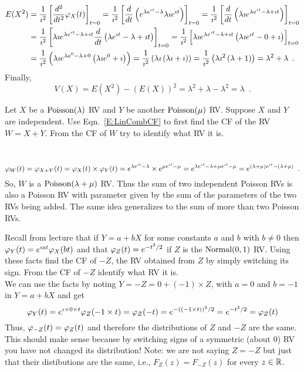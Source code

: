 \begin{ExerciseList}
\begin{align*}
E(X^2) 
&= \frac{1}{\imath^2} \left[ \frac{d^2}{dt^2} \varphi_X(t) \right]_{t=0}
= \frac{1}{\imath^2} \left[ \frac{d}{dt} \left( e^{\lambda e^{\imath t} - \lambda} \lambda \imath e^{\imath t} \right) \right]_{t=0}
= \frac{1}{\imath^2} \left[ \frac{d}{dt} \left( \lambda \imath e^{\lambda e^{\imath t} - \lambda + \imath t} \right) \right]_{t=0}\\
&= \frac{1}{\imath^2} \left[ \lambda \imath e^{\lambda e^{\imath t} - \lambda + \imath t} \frac{d}{dt} \left( \lambda e^{\imath t} - \lambda + \imath t \right) \right]_{t=0}
= \frac{1}{\imath^2} \left[ \lambda \imath e^{\lambda e^{\imath t} - \lambda + \imath t} \left( \lambda \imath e^{\imath t} - 0 + \imath \right) \right]_{t=0}\\
&= \frac{1}{\imath^2} \left( \lambda \imath e^{\lambda e^{0} - \lambda + 0} \left( \lambda \imath e^{0}  + \imath \right) \right)
= \frac{1}{\imath^2} \left( \lambda \imath \left( \lambda \imath  + \imath \right) \right)
= \frac{1}{\imath^2} \left( \lambda \imath^2 \left( \lambda  + 1 \right) \right)
= \lambda^2 + \lambda \enspace .
\end{align*}
Finally,
\[
V(X) = E(X^2) - (E(X))^2 = \lambda^2 + \lambda - \lambda^2 = \lambda \enspace .
\]
\ee

\Exercise
Let $X$ be a $\mbox{{\rm Poisson}}(\lambda)$ RV and $Y$ be another $\mbox{{\rm Poisson}}(\mu)$ RV.  
Suppose $X$ and $Y$ are independent.
Use Eqn.~\eqref{E:LinCombCF} to first find the CF of the RV $W=X+Y$.  
From the CF of $W$ try to identify what RV it is. 

\Answer
~\\
\[
\varphi_{W}(t) = \varphi_{X+Y}(t) = \varphi_X(t) \times \varphi_Y(t) 
= e^{\lambda e^{\imath t}-\lambda} \times e^{\mu e^{\imath t}-\mu}
= e^{\lambda e^{\imath t}-\lambda + \mu e^{\imath t}-\mu} 
= e^{(\lambda+\mu) e^{\imath t} -(\lambda+\mu)} \enspace . 
\]
So, $W$ is a $\mbox{{\rm Poisson}}(\lambda+\mu)$ RV. Thus the sum of two independent Poisson RVs is also a Poisson RV with parameter given by the sum of the parameters of the two RVs being added.  The same idea generalizes to the sum of more than two Poisson RVs. 

\Exercise
Recall from lecture that if $Y=a+bX$ for some constants $a$ and $b$ with $b\neq 0$ then $\varphi_Y(t) = e^{\imath a t} \varphi_X(bt)$ and that $\varphi_Z(t)=e^{-t^2/2}$ if $Z$ is the $\mbox{{\rm Normal}}(0,1)$ RV.  
Using these facts find the CF of $-Z$, the RV obtained from $Z$ by simply switching its sign.
From the CF of $-Z$ identify what RV it is.
\Answer
~\\
We can use the facts by noting $Y=-Z = 0 + (-1) \times Z$, with $a=0$ and $b=-1$ in $Y=a+bX$ and get
\[
\varphi_{Y}(t) = e^{\imath \times 0 \times t} \varphi_Z(-1 \times t) = \varphi_Z(-t) = e^{-((-1 \times t))^2/2} = e^{-t^2/2} = \varphi_Z(t)
\]
Thus, $\varphi_{-Z}(t) = \varphi_Z(t)$ and therefore the distributions of $Z$ and $-Z$ are the same. This should make sense because by switching signs of a symmetric (about $0$) RV you have not changed its distribution!  Note: we are not saying $Z=-Z$ but just that their distibutions are the same, i.e., $F_Z(z) = F_{-Z}(z)$ for every $z \in \mathbb{R}$.

\end{ExerciseList}

